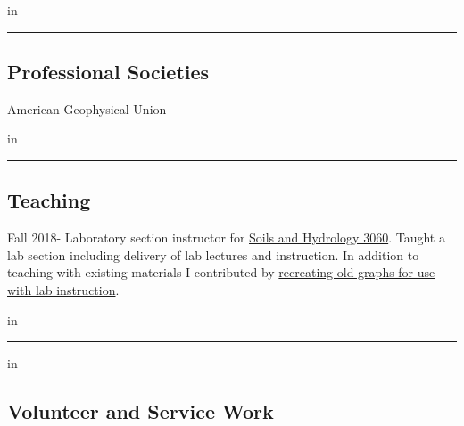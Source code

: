 \documentclass[10pt,letterpaper]{article}
\begin{document}
 in

\hrule
\vspace{-0.4em}
\vskip 0.2in
\subsection*{Professional Societies}

	American Geophysical Union

 in

\hrule
\vspace{-0.4em}
\vskip 0.2in
\subsection*{Teaching}

Fall 2018- Laboratory section instructor for \href{http://www.hydrology.uga.edu/rasmussen/class/3060/index.html}{Soils and Hydrology 3060}. Taught a lab section including delivery of lab lectures and instruction. In addition to teaching with existing materials I contributed by \href{https://seyounger.github.io/soils_and_hydro_teaching/}{recreating old graphs for use with lab instruction}.

 in

\hrule
\vspace{-0.4em}
 in
\subsection*{Volunteer and Service Work}
\end{document}

